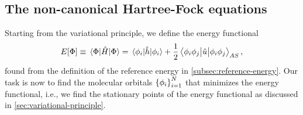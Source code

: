         \subsection{The non-canonical Hartree-Fock equations}
            Starting from the variational principle, we define the energy
            functional
            \begin{align}
                E[\Phi]
                \equiv \mel{\Phi}{\hat{H}}{\Phi}
                =
                \mel{\phi_i}{\hat{h}}{\phi_i}
                + \frac{1}{2}\mel{\phi_i\phi_j}{\hat{u}}{\phi_i\phi_j}_{AS},
                \label{eq:energy_func_hf}
            \end{align}
            found from the definition of the reference energy in
            \autoref{subsec:reference-energy}.
            Our task is now to find the molecular orbitals $\left\{ \phi_i \right\}_{i =
            1}^{N}$ that minimizes the energy functional, i.e., we find the
            stationary points of the energy functional as discussed in
            \autoref{sec:variational-principle}.
